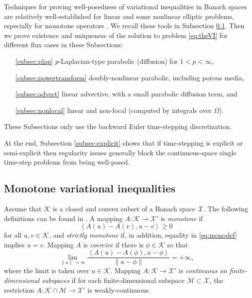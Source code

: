 \documentclass[final,onefignum]{siamart190516}
\newcommand{\ip}[2]{\ensuremath{\left<#1,#2\right>}}
\begin{document}
Techniques for proving well-posedness of variational inequalities in Banach spaces are relatively well-established for linear and some nonlinear elliptic problems, especially for monotone operators \cite{KinderlehrerStampacchia1980}.  We recall these tools in Subsection \ref{subsec:mono}.  Then we prove existence and uniqueness of the solution to problem \eqref{eq:theVI} for different flux cases in these Subsections:
\begin{itemize}
\item[\ref{subsec:plap}] $p$-Laplacian-type parabolic (diffusion) for $1<p<\infty$,
\item[\ref{subsec:powertransform}] doubly-nonlinear parabolic, including porous media,
\item[\ref{subsec:advect}] linear advective, with a small parabolic diffusion term, and
\item[\ref{subsec:nonlocal}] linear and non-local (computed by integrals over $\Omega$).
\end{itemize}
These Subsections only use the backward Euler time-stepping discretization.

At the end, Subsection \ref{subsec:explicit} shows that if time-stepping is explicit or semi-explicit then regularity issues generally block the continuous-space single time-step problems from being well-posed.


\subsection{Monotone variational inequalities} \label{subsec:mono}  Assume that $\mathcal{K}$ is a closed and convex subset of a Banach space $\mathcal{X}$.  The following definitions can be found in \cite{KinderlehrerStampacchia1980}.  A mapping $A : \mathcal{K} \to \mathcal{X}'$ is \emph{monotone} if
\begin{equation}
   \ip{A(u) - A(v)}{u-v} \ge 0  \label{eq:monodef}
\end{equation}
for all $u,v\in\mathcal{K}$, and \emph{strictly monotone} if, in addition, equality in \eqref{eq:monodef} implies $u=v$.  Mapping $A$ is \emph{coercive} if there is $\phi\in \mathcal{K}$ so that
\begin{equation}
   \lim_{\|u\|\to\infty} \frac{\ip{A(u) - A(\phi)}{u-\phi}}{\|u-\phi\|} = +\infty, \label{eq:coercivedef}
\end{equation}
where the limit is taken over $u\in\mathcal{K}$.  Mapping $A : \mathcal{K} \to \mathcal{X}'$ is \emph{continuous on finite-dimensional subspaces} if for each finite-dimensional subspace $\mathcal{M} \subset \mathcal{X}$, the restriction $A : \mathcal{K}\cap \mathcal{M} \to \mathcal{X}'$ is weakly-continuous.
\end{document}
